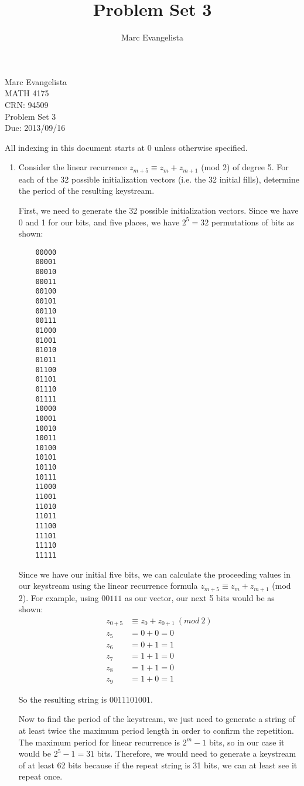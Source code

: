\documentclass[10pt,letterpaper]{report}
\author{Marc Evangelista}
\title{Problem Set 3}
\begin{document}
\begin{flushright}
Marc Evangelista \\
MATH 4175 \\ 
CRN: 94509 \\
Problem Set 3 \\
Due: 2013/09/16
\end{flushright}
	All indexing in this document starts at 0 unless otherwise specified.
\begin{enumerate}

	\item Consider the linear recurrence $z_{m+5} \equiv z_m + z_{m+1}$
	(mod 2) of degree 5. For each of the 32 possible initialization vectors (i.e. the 32 initial fills),
	determine the period of the resulting keystream.
	\par
	First, we need to generate the 32 possible initialization vectors. Since we have
	0 and 1 for our bits, and five places, we have $2^5 = 32$ permutations of bits as
	shown:
	\begin{multicols}{4}
	\begin{verbatim}
	00000
	00001
	00010
	00011
	00100
	00101
	00110
	00111
	01000
	01001
	01010
	01011
	01100
	01101
	01110
	01111
	10000
	10001
	10010
	10011
	10100
	10101
	10110
	10111
	11000
	11001
	11010
	11011
	11100
	11101
	11110
	11111
	\end{verbatim}
	\end{multicols}

	\par
	Since we have our initial five bits, we can calculate the proceeding values 
	in our keystream using
	the linear recurrence formula $z_{m+5} \equiv z_m + z_{m+1}$ (mod 2). For example, using
	$00111$ as our vector, our next 5 bits would be as shown:
	\begin{align*}
	z_{0+5} &\equiv z_0 + z_{0+1}\ (mod \ 2) \\
	z_5 &= 0 + 0 = 0 \\
	z_6 &= 0 + 1 = 1 \\
	z_7 &= 1 + 1 = 0 \\
	z_8 &= 1 + 1 = 0 \\
	z_9 &= 1 + 0 = 1
	\end{align*}
	
	So the resulting string is $0011101001$. 
	\par	
	Now to find the period of the keystream,
	we just need to generate a string of at least twice the maximum period length in
	order to confirm the repetition. The
	maximum period for linear recurrence is $2^m - 1$ bits, so in our case it would be
	$2^{5} - 1 = 31$ bits. Therefore, we would need to generate a keystream of at least 62
	bits because if the repeat string is 31 bits, we can at least see it repeat once.
	

\end{enumerate}
\end{document}
